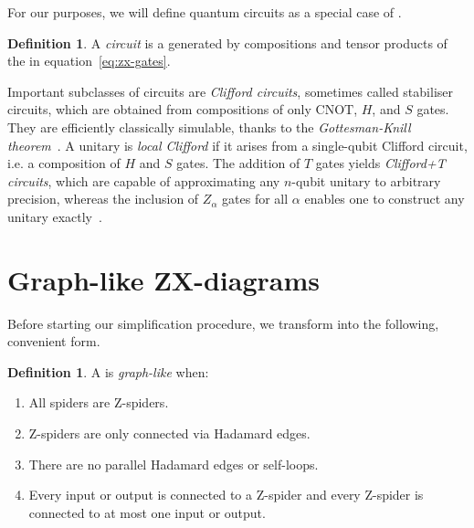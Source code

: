 \documentclass[a4paper,onecolumn,superscriptaddress,11pt,accepted=2020-04-27]{quantumarticle}
\newcommand{\CX}{\ensuremath{\textrm{CNOT}}\xspace}
\newcommand{\CNOT}{\CX}
\theoremstyle{definition}
\newtheorem{definition}[theorem]{Definition}
\newtheorem{example}[theorem]{Example}
\newcommand{\NOTEr}[1]{\marginpar{\footnotesize {\color{magenta} \noindent\textbf{r:} #1}}}
\begin{document}

\noindent For our purposes, we will define quantum circuits as a special case of \zxdiagrams.

\begin{definition}\label{def:circuit}
  A \emph{circuit} is a \zxdiagram generated by compositions and tensor products of the \zxdiagrams in equation~\eqref{eq:zx-gates}.
\end{definition}

Important subclasses of circuits are \textit{Clifford circuits}, sometimes called stabiliser circuits, which are obtained from compositions of only \CNOT, $H$, and $S$ gates. They are efficiently classically simulable, thanks to the \textit{Gottesman-Knill theorem}~\cite{aaronsongottesman2004}. A unitary is \textit{local Clifford} if it arises from a single-qubit Clifford circuit, i.e. a composition of $H$ and $S$ gates. The addition of $T$ gates yields \textit{Clifford+T circuits}, which are capable of approximating any $n$-qubit unitary to arbitrary precision, whereas the inclusion of $Z_\alpha$ gates for all $\alpha$ enables one to construct any unitary exactly~\cite{NielsenChuang}.

\section{Graph-like ZX-diagrams}\label{sec:graph-like-zx}


Before starting our simplification procedure, we transform \zxdiagrams into the following, convenient form. 



\begin{definition}\label{def:graph-form}
  A \zxdiagram is \emph{graph-like} when:
  \begin{enumerate}
    \item All spiders are Z-spiders.
    \item Z-spiders are only connected via Hadamard edges.
    \item There are no parallel Hadamard edges or self-loops.
    \item Every input or output is connected to a Z-spider and every Z-spider is connected to at most one input or output.
  \end{enumerate}
\end{definition}
\end{document}
